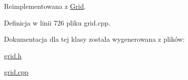 Reimplementowana z \hyperlink{class_grid_ac0cf78c28206fd44fba21c5a91d0a0e0}{Grid}.



Definicja w linii 726 pliku grid.\+cpp.



Dokumentacja dla tej klasy została wygenerowana z plików\+:\begin{DoxyCompactItemize}
\item 
\hyperlink{grid_8h}{grid.\+h}\item 
\hyperlink{grid_8cpp}{grid.\+cpp}\end{DoxyCompactItemize}
